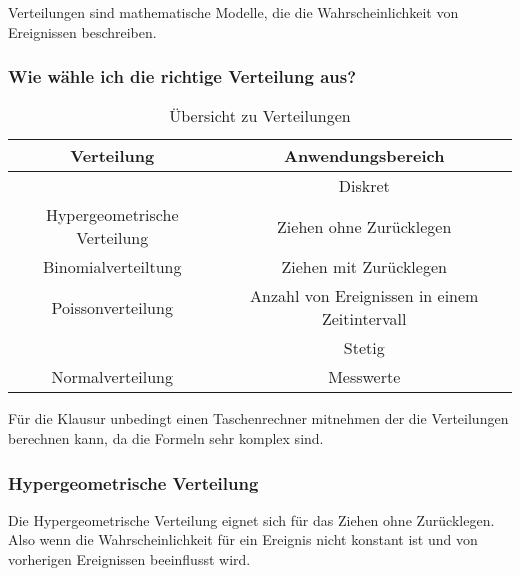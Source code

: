 \documentclass[12pt]{scrartcl}
\begin{document}
Verteilungen sind mathematische Modelle, die die Wahrscheinlichkeit von Ereignissen beschreiben.

\subsubsection{Wie wähle ich die richtige Verteilung aus?}

\begin{table}[h]
    \begin{tabular}{ | c | c | }
        \hline
        Verteilung                   & Anwendungsbereich                             \\
        \hline
        \hline
                                     & Diskret                                       \\
        \hline
        Hypergeometrische Verteilung & Ziehen ohne Zurücklegen                       \\
        \hline
        Binomialverteiltung          & Ziehen mit Zurücklegen                        \\
        \hline
        Poissonverteilung            & Anzahl von Ereignissen in einem Zeitintervall \\
        \hline
        \hline
                                     & Stetig                                        \\
        \hline
        Normalverteilung             & Messwerte                                     \\
        \hline
    \end{tabular}
    \caption{Übersicht zu Verteilungen}
\end{table}

Für die Klausur unbedingt einen Taschenrechner mitnehmen der die Verteilungen berechnen kann,
da die Formeln sehr komplex sind.

\subsubsection{Hypergeometrische Verteilung}

Die Hypergeometrische Verteilung eignet sich für das Ziehen ohne Zurücklegen.
Also wenn die Wahrscheinlichkeit für ein Ereignis nicht konstant ist und von vorherigen Ereignissen beeinflusst wird.
\end{document}

